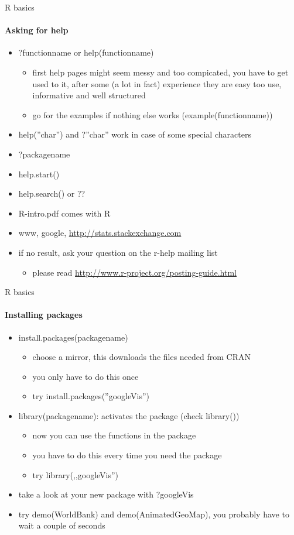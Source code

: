 \documentclass[10pt]{beamer}
\begin{document}
\begin{frame}{R basics}
\framesubtitle{Asking for help}
\begin{itemize}
\item ?functionname or help(functionname)
\begin{itemize}
\item first help pages might seem messy and too compicated, you have to get used to it, after some (a lot in fact) experience they are easy too use, informative and well structured
\item go for the examples if nothing else works (example(functionname))
\end{itemize}
\item help(''char'') and ?''char'' work in case of some special characters
\item ?packagename
\item help.start()
\item help.search() or ??
\item R-intro.pdf comes with R
\item www, google, \textcolor{blue}{\url{http://stats.stackexchange.com}}
\item if no result, ask your question on the r-help mailing list
\begin{itemize}
\item please read \textcolor{blue}{\url{http://www.r-project.org/posting-guide.html}}
\end{itemize}
\end{itemize}
\end{frame}

\begin{frame}{R basics}
\framesubtitle{Installing packages}
\begin{itemize}
\item install.packages(packagename)
\begin{itemize}
\item choose a mirror, this downloads the files needed from CRAN
\item you only have to do this once
\item try install.packages(''googleVis'')
\end{itemize}
\item library(packagename): activates the package (check library())
\begin{itemize}
\item now you can use the functions in the package
\item you have to do this every time you need the package
\item try library(,,googleVis'')
\end{itemize}
\item take a look at your new package with ?googleVis
\item try demo(WorldBank) and demo(AnimatedGeoMap), you probably have to wait a couple of seconds
\end{itemize}
\end{frame}
\end{document}
